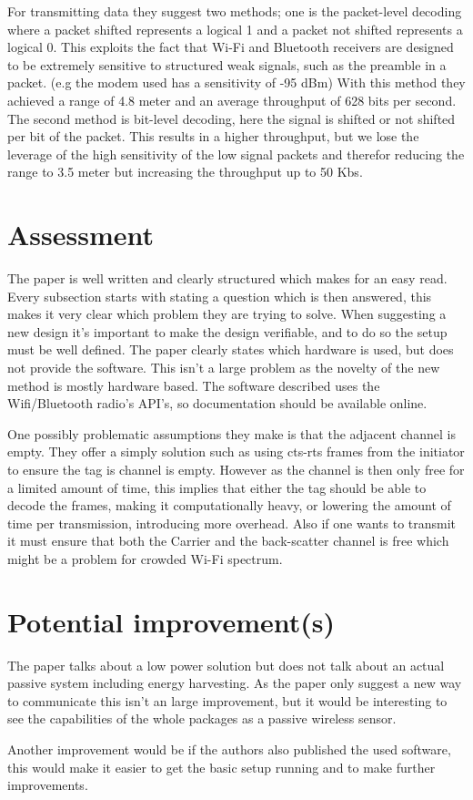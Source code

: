 \documentclass [a4,twoside,11pt] {article}
\begin{document}
For transmitting data they suggest two methods; one is the packet-level decoding where a packet shifted represents a logical 1 and a packet not shifted represents a logical 0. This exploits the fact that Wi-Fi and Bluetooth receivers are designed to be extremely sensitive to structured weak signals, such as the preamble in a packet. (e.g the modem used has a sensitivity of -95 dBm) With this method they achieved a range of 4.8 meter and an average throughput of 628 bits per second. The second method is bit-level decoding, here the signal is shifted or not shifted per bit of the packet. This results in a higher throughput, but we lose the leverage of the high sensitivity of the low signal packets and therefor reducing the range to 3.5 meter but increasing the throughput up to 50 Kbs.

\newpage{}
\section{Assessment}

The paper is well written and clearly structured which makes for an easy read. Every subsection starts with stating a question which is then answered, this makes it very clear which problem they are trying to solve. When suggesting a new design it's important to make the design verifiable, and to do so the setup must be well defined. The paper clearly states which hardware is used, but does not provide the software. This isn't a large problem as the novelty of the new method is mostly hardware based. The software described uses the Wifi/Bluetooth radio's API's, so documentation should be available online.

One possibly problematic assumptions they make is that the adjacent channel is empty. They offer a simply solution such as using cts-rts frames from the initiator to ensure the tag is channel is empty. However as the channel is then only free for a limited amount of time, this implies that either the tag should be able to decode the frames, making it computationally heavy, or lowering the amount of time per transmission, introducing more overhead. 
Also if one wants to transmit it must ensure that both the Carrier and the back-scatter channel is free which might be a problem for crowded Wi-Fi spectrum.

\section{Potential improvement(s)}
The paper talks about a low power solution but does not talk about an actual passive system including energy harvesting. As the paper only suggest a new way to communicate this isn't an large improvement, but it would be interesting to see the capabilities of the whole packages as a passive wireless sensor.

Another improvement would be if the authors also published the used software, this would make it easier to get the basic setup running and to make further improvements.
\end{document}
